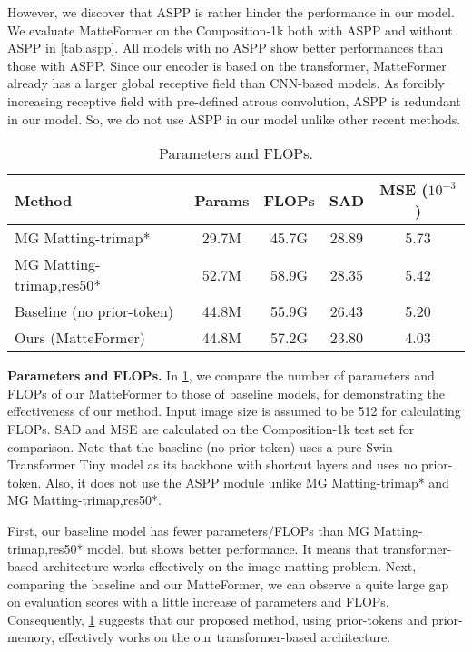 \documentclass[10pt,twocolumn,letterpaper]{article}
\begin{document}
However, we discover that ASPP is rather hinder the performance in our model. We evaluate MatteFormer on the Composition-1k both with ASPP and without ASPP in \cref{tab:aspp}. All models with no ASPP show better performances than those with ASPP. Since our encoder is based on the transformer, MatteFormer already has a larger global receptive field than CNN-based models. As forcibly increasing receptive field with pre-defined atrous convolution, ASPP is redundant in our model. So, we do not use ASPP in our model unlike other recent methods. 



\begin{table}
  \centering
  \begin{adjustbox}{width = \linewidth}
  \begin{tabular}{l | c c c c}
    \toprule
    Method & Params & FLOPs & SAD & \makecell{MSE \\ ($10^{-3}$)}\\
    \midrule
    MG Matting-trimap* & 29.7M & 45.7G & 28.89 & 5.73 \\
    MG Matting-trimap,res50* & 52.7M & 58.9G & 28.35 & 5.42 \\
    \midrule
    Baseline (no prior-token) & 44.8M & 55.9G & 26.43 & 5.20 \\
    \hline
    Ours (MatteFormer) & 44.8M & 57.2G & 23.80 & 4.03 \\
    \bottomrule
  \end{tabular}
  \end{adjustbox}
  \caption{Parameters and FLOPs. }
  \label{tab:paramflop}
  \vspace{-2mm}
\end{table}

\vspace{2mm}
\textbf{Parameters and FLOPs.}
In \cref{tab:paramflop}, we compare the number of parameters and FLOPs of our MatteFormer to those of baseline models, for demonstrating the effectiveness of our method. Input image size is assumed to be 512 for calculating FLOPs. SAD and MSE are calculated on the Composition-1k test set for comparison.
Note that the baseline (no prior-token) uses a pure Swin Transformer Tiny model as its backbone with shortcut layers and uses no prior-token. Also, it does not use the ASPP module unlike MG Matting-trimap* and MG Matting-trimap,res50*.

First, our baseline model has fewer parameters/FLOPs than MG Matting-trimap,res50* model, but shows better performance. It means that transformer-based architecture works effectively on the image matting problem. 
Next, comparing the baseline and our MatteFormer, we can observe a quite large gap on evaluation scores with a little increase of parameters and FLOPs. Consequently, \cref{tab:paramflop} suggests that our proposed method, using prior-tokens and prior-memory, effectively works on the our transformer-based architecture.
\end{document}
